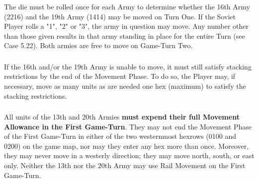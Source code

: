 \subsubsection{} The die must be rolled once for each Army to determine whether the 16th Army (2216) and the 19th Army (1414) may be moved on Turn One. If the Soviet Player rolls a "1", "2" or "3", the army in question may move. Any number other than those given results in that army standing in place for the entire Turn (see Case 5.22). Both armies are free to move on Game-Turn Two.

\subsubsection{} If the 16th and/or the 19th Army is unable to move, it must still satisfy stacking restrictions by the end of the Movement Phase. To do so, the Player may, if necessary, move as many units as are needed one hex (maximum) to satisfy the stacking restrictions.

\subsubsection{} All units of the 13th and 20th Armies \textbf{must expend their full Movement Allowance in the First Game-Turn}. They may not end the Movement Phase of the First Game-Turn in either of the two westernmost hexrows (0100 and 0200) on the game map, nor may they enter any hex more than once. Moreover, they may never move in a westerly direction; they may move north, south, or east only. Neither the 13th nor the 20th Army may use Rail Movement on the First Game-Turn.